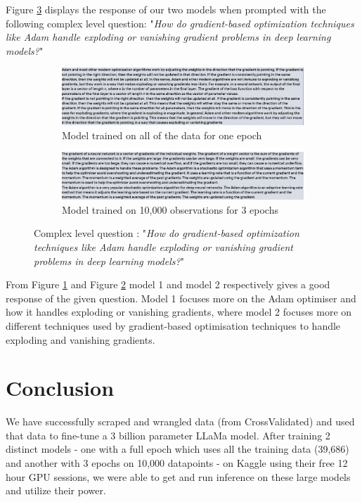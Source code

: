 \documentclass[10pt]{article}
\begin{document}
Figure \ref{fig: Q3} displays the response of our two models when prompted with the following complex
level question: "\textit{How do gradient-based optimization techniques like Adam handle exploding or vanishing gradient problems in deep learning models?}"
\begin{figure}[H]
    \centering
    \begin{subfigure}[b]{0.45\textwidth}
        \centering
        \includegraphics[width=\textwidth]{Images/1EpochQ3.png}
        \caption{Model trained on all of the data for one epoch}
        \label{fig: Q3_Model1}
    \end{subfigure}
    \hfill
    \begin{subfigure}[b]{0.5\textwidth}
        \centering
        \includegraphics[width=\textwidth]{Images/10kQ3.png}
        \caption{Model trained on 10,000 observations for 3 epochs}
        \label{fig: Q3_Model2}
    \end{subfigure}
    \caption{Complex level question : "\textit{How do gradient-based optimization techniques like Adam handle exploding or vanishing gradient problems in deep learning models?}"}
    \label{fig: Q3}
\end{figure}
From Figure \ref{fig: Q3_Model1} and Figure \ref{fig: Q3_Model2} model 1 and model 2 respectively
gives a good response of the given question. Model 1 focuses more on the Adam optimiser and how
it handles exploding or vanishing gradients, where
model 2 focuses more on different techniques used by gradient-based optimisation techniques
to handle exploding and vanishing gradients.   

\section{Conclusion}

We have successfully scraped and wrangled data (from CrossValidated)
and used that data to fine-tune a 3 billion parameter LLaMa model.
After training 2 distinct models - one with a full epoch which uses all the
training data (39,686) and another with 3 epochs on 10,000 datapoints - on
Kaggle using their free 12 hour GPU sessions, we were able to get and run
inference on these large models and utilize their power.
\end{document}
